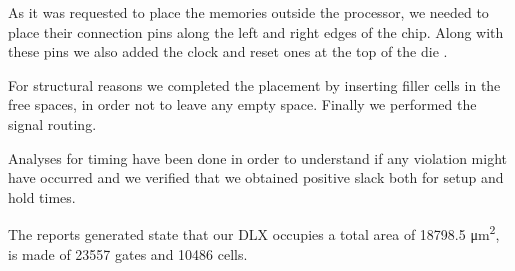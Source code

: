 As it was requested to place the memories outside the processor, we needed to place their connection pins along the left and right edges of the chip. 
Along with these pins we also added the clock and reset ones at the top of the die .

For structural reasons we completed the placement by inserting filler cells in the free spaces, in order not to leave any empty space. 
Finally we performed the signal routing.

Analyses for timing have been done in order to understand if any violation might have occurred and we verified that we obtained positive slack both for setup and hold times.

The reports generated state that our DLX occupies a total area of 18798.5 \si{\micro\meter\squared}, is made of 23557 gates and 10486 cells.

